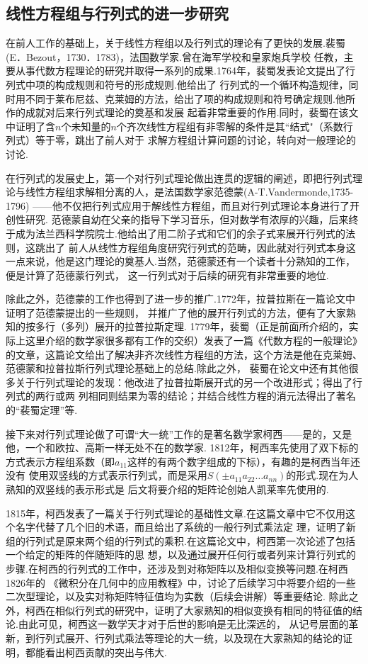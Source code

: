 \subsection{线性方程组与行列式的进一步研究}
在前人工作的基础上，关于线性方程组以及行列式的理论有了更快的发展.裴蜀(E．Bezout，1730．1783)，法国数学家.曾在海军学校和皇家炮兵学校
任教，主要从事代数方程理论的研究并取得一系列的成果.1764年，裴蜀发表论文提出了行列式中项的构成规则和符号的形成规则.他给出了
行列式的一个循环构造规律，同时用不同于莱布尼兹、克莱姆的方法，给出了项的构成规则和符号确定规则.他所作的成就对后来行列式理论的奠基和发展
起着非常重要的作用.同时，裴蜀在该文中证明了含$n$个未知量的$n$个齐次线性方程组有非零解的条件是其“结式"（系数行列式）等于零，跳出了前人对于
求解方程组计算问题的讨论，转向对一般理论的讨论.

在行列式的发展史上，第一个对行列式理论做出连贯的逻辑的阐述，即把行列式理论与线性方程组求解相分离的人，是法国数学家范德蒙(A-T.Vandermonde,1735-1796)
——他不仅把行列式应用于解线性方程组，而且对行列式理论本身进行了开创性研究.
范德蒙自幼在父亲的指导下学习音乐，但对数学有浓厚的兴趣，后来终于成为法兰西科学院院士.他给出了用二阶子式和它们的余子式来展开行列式的法则，这跳出了
前人从线性方程组角度研究行列式的范畴，因此就对行列式本身这一点来说，他是这门理论的奠基人.当然，范德蒙还有一个读者十分熟知的工作，便是计算了范德蒙行列式，
这一行列式对于后续的研究有非常重要的地位.

除此之外，范德蒙的工作也得到了进一步的推广.1772年，拉普拉斯在一篇论文中证明了范德蒙提出的一些规则，
并推广了他的展开行列式的方法，便有了大家熟知的按多行（多列）展开的拉普拉斯定理.
1779年，裴蜀（正是前面所介绍的，实际上这里介绍的数学家很多都有工作的交织）发表了一篇《代数方程的一般理论》
的文章，这篇论文给出了解决非齐次线性方程组的方法，这个方法是他在克莱姆、范德蒙和拉普拉斯行列式理论基础上的总结.除此之外，
裴蜀在论文中还有其他很多关于行列式理论的发现：他改进了拉普拉斯展开式的另一个改进形式；得出了行列式的两行或两
列相同则结果为零的结论；并结合线性方程的消元法得出了著名的``裴蜀定理''等.

接下来对行列式理论做了可谓``大一统''工作的是著名数学家柯西——是的，又是他，一个和欧拉、高斯一样无处不在的数学家.
1812年，柯西率先使用了双下标的方式表示方程组系数（即$a_{11}$这样的有两个数字组成的下标），有趣的是柯西当年还没有
使用双竖线的方式表示行列式，而是采用$S(\pm a_{11}a_{22}\ldots a_{nn})$的形式.现在为人熟知的双竖线的表示形式是
后文将要介绍的矩阵论创始人凯莱率先使用的.

1815年，柯西发表了一篇关于行列式理论的基础性文章.在这篇文章中它不仅用这个名字代替了几个旧的术语，而且给出了系统的一般行列式乘法定
理，证明了新组的行列式是原来两个组的行列式的乘积.在这篇论文中，柯西第一次论述了包括一个给定的矩阵的伴随矩阵的思
想，以及通过展开任何行或者列来计算行列式的步骤.在柯西的行列式的工作中，还涉及到对称矩阵以及相似变换等问题.在柯西1826年的
《微积分在几何中的应用教程》中，讨论了后续学习中将要介绍的一些二次型理论，以及实对称矩阵特征值均为实数（后续会讲解）等重要结论.
除此之外，柯西在相似行列式的研究中，证明了大家熟知的相似变换有相同的特征值的结论.由此可见，柯西这一数学天才对于后世的影响是无比深远的，
从记号层面的革新，到行列式展开、行列式乘法等理论的大一统，以及现在大家熟知的结论的证明，都能看出柯西贡献的突出与伟大.

